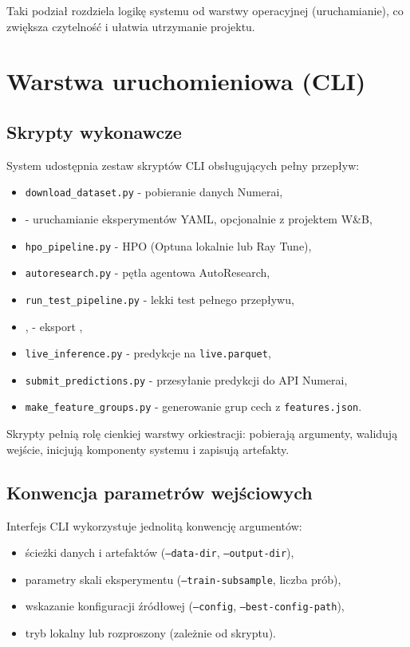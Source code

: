 \documentclass[12pt,a4paper]{report}
\begin{document}
Taki podział rozdziela logikę systemu od warstwy operacyjnej (uruchamianie),
co zwiększa czytelność i ułatwia utrzymanie projektu.

\section{Warstwa uruchomieniowa (CLI)}
\subsection{Skrypty wykonawcze}
System udostępnia zestaw skryptów CLI obsługujących pełny przepływ:
\begin{itemize}\item \texttt{download\_dataset.py} - pobieranie danych Numerai,
\item {} - uruchamianie eksperymentów YAML,
    opcjonalnie z projektem W\&B,
\item \texttt{hpo\_pipeline.py} - HPO (Optuna lokalnie lub Ray Tune),
\item \texttt{autoresearch.py} - pętla agentowa AutoResearch,
\item \texttt{run\_test\_pipeline.py} - lekki test pełnego przepływu,
\item {},  -
    eksport ,
\item \texttt{live\_inference.py} - predykcje na \texttt{live.parquet},
\item \texttt{submit\_predictions.py} - przesyłanie predykcji do API Numerai,
\item \texttt{make\_feature\_groups.py} - generowanie grup cech z \texttt{features.json}.\end{itemize}

Skrypty pełnią rolę cienkiej warstwy orkiestracji: pobierają argumenty, walidują wejście,
inicjują komponenty systemu i zapisują artefakty.

\subsection{Konwencja parametrów wejściowych}
Interfejs CLI wykorzystuje jednolitą konwencję argumentów:
\begin{itemize}\item ścieżki danych i artefaktów (\texttt{--data-dir}, \texttt{--output-dir}),
\item parametry skali eksperymentu (\texttt{--train-subsample}, liczba prób),
\item wskazanie konfiguracji źródłowej (\texttt{--config}, \texttt{--best-config-path}),
\item tryb lokalny lub rozproszony (zależnie od skryptu).\end{itemize}
\end{document}
